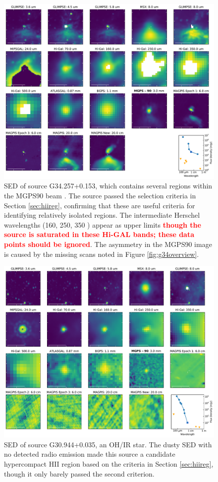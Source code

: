 \documentclass[twocolumn]{aastex62}
\def\edit#1{{\textcolor{red}{\textbf{#1}}}}
\newcommand{\MGPS}{MGPS90\xspace}
\begin{document}
\begin{figure}[htp]
\includegraphics[width=17cm]{figures/SED_plot_G34_G34.257+0.153.pdf}
\caption{SED of source G34.257+0.153, which contains several \hchii regions
within the MGPS90 beam \citep{Avalos2009a,Sewilo2011a}.  The source passed the
selection criteria in Section \ref{sec:hiireg}, confirming that these are
useful criteria for identifying relatively isolated \hchii regions. The
intermediate Herschel wavelengths (160, 250, 350 \um) appear as upper limits
\edit{ though the source is saturated in these Hi-GAL bands; these data points
should be ignored}.  The asymmetry in the
\MGPS image is caused by the missing scans noted in Figure
\ref{fig:g34overview}.}
\label{fig:g34hchii}
\end{figure}


\begin{figure}[htp]
\includegraphics[width=17cm]{figures/SED_plot_G31_G30.944+0.035.pdf}
\caption{SED of source G30.944+0.035, an OH/IR star.  The dusty SED with no
detected radio emission made this source a candidate hypercompact HII region
based on the criteria in Section \ref{sec:hiireg}, though it only barely passed
the second criterion.}
\label{fig:g31ohir}
\end{figure}
\end{document}
